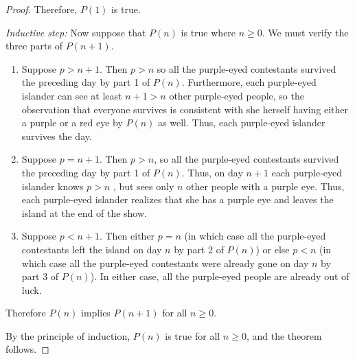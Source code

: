 \documentclass[12pt]{article}
\begin{document}
{\begin{proof}
\noindent Therefore, $P(1)$ is true.

\noindent \textit{Inductive step:} Now suppose that $P(n)$ is true
where $n \geq 0$.  We must verify the three parts of $P(n+1)$.

\begin{enumerate}

\item Suppose $p > n + 1$.  Then $p > n$ so all the purple-eyed
contestants survived the preceding day by part 1 of $P(n)$.
Furthermore, each purple-eyed islander can see at least $n + 1 > n$
other purple-eyed people, so the observation that everyone survives is
consistent with she herself having either a purple or a red eye by
$P(n)$ as well.  Thus, each purple-eyed islander survives the day.

\item Suppose $p = n + 1$.  Then $p > n$, so all the purple-eyed
contestants survived the preceding day by part 1 of $P(n)$.  Thus, on
day $n + 1$ each purple-eyed islander knows $p > n$
, but sees only $n$ other people with a purple eye.  Thus, each
purple-eyed islander realizes that she has a purple eye and leaves the
island at the end of the show.

\item Suppose $p < n + 1$.  Then either $p = n$ (in which case all the
purple-eyed contestants left the island on day $n$ by part 2 of
$P(n)$) or else $p < n$ (in which case all the purple-eyed contestants
were already gone on day $n$ by part 3 of $P(n)$).  In either case,
all the purple-eyed people are already out of luck.

\end{enumerate}

\noindent Therefore $P(n)$ implies $P(n+1)$ for all $n \geq 0$.

By the principle of induction, $P(n)$ is true for all $n \geq 0$, and
the theorem follows.
\end{proof}
}

\iffalse
\noindent If there are at least two blue-eyed people, then the
explorer didn't tell the villagers anything that they didn't already
know, so why was his arrival significant?

\solution{The explorer changes what the villagers know about what
their compatriots are thinking.  For example, suppose that there are
only two villagers, $X$ and $Y$, both with blue eyes.  Before the
explorer arrives, both $X$ and $Y$ know that there is a villager with
blue eyes.  But neither knows that the \textit{other} realizes this.
In contrast, after the explorer makes his statement, each villager
knows that the other knows that someone has blue eyes.}
\fi

\end{document}
